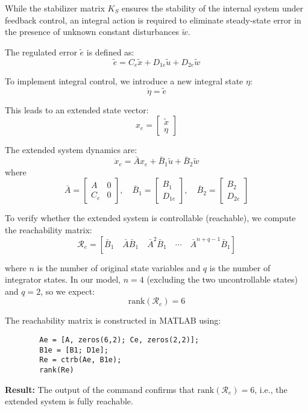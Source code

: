 \documentclass[]{report}
\begin{document}
	While the stabilizer matrix $K_S$ ensures the stability of the internal system under feedback control, an integral action is required to eliminate steady-state error in the presence of unknown constant disturbances $\tilde{w}$.
	
	The regulated error $\tilde{e}$ is defined as:
	\[
	\tilde{e} = C_e \tilde{x} + D_{1e} \tilde{u} + D_{2e} \tilde{w}
	\]
	
	To implement integral control, we introduce a new integral state $\eta$:
	\[
	\dot{\eta} = \tilde{e}
	\]
	
	This leads to an extended state vector:
	\[
	x_e = \begin{bmatrix} \tilde{x} \\ \eta \end{bmatrix}
	\]
	
	The extended system dynamics are:
	\[
	\dot{x}_e = \bar{A} x_e + \bar{B}_1 \tilde{u} + \bar{B}_2 \tilde{w}
	\]
	where
	\[
	\bar{A} = \begin{bmatrix}
		A & 0 \\
		C_e & 0
	\end{bmatrix},
	\quad
	\bar{B}_1 = \begin{bmatrix}
		B_1 \\
		D_{1e}
	\end{bmatrix},
	\quad
	\bar{B}_2 = \begin{bmatrix}
		B_2 \\
		D_{2e}
	\end{bmatrix}
	\]
	
	To verify whether the extended system is controllable (reachable), we compute the reachability matrix:
	\[
	\mathcal{R}_e = \left[\bar{B}_1 \quad \bar{A}\bar{B}_1 \quad \bar{A}^2\bar{B}_1 \quad \cdots \quad \bar{A}^{n+q-1} \bar{B}_1 \right]
	\]
	
	where $n$ is the number of original state variables and $q$ is the number of integrator states. In our model, $n=4$ (excluding the two uncontrollable states) and $q=2$, so we expect:
	\[
	\text{rank}(\mathcal{R}_e) = 6
	\]
	
	The reachability matrix is constructed in MATLAB using:
	
	\begin{verbatim}
		Ae = [A, zeros(6,2); Ce, zeros(2,2)];
		B1e = [B1; D1e];
		Re = ctrb(Ae, B1e);
		rank(Re)
	\end{verbatim}
	
	\textbf{Result:}  
	The output of the command confirms that $\text{rank}(\mathcal{R}_e) = 6$, i.e., the extended system is fully reachable.
	
\end{document}
